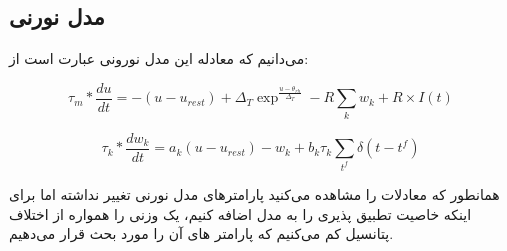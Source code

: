 \documentclass[12pt]{extreport}
\theoremstyle{definition}
\begin{document}
\subsection*{مدل نورنی }

می‌دانیم که معادله این مدل نورونی عبارت است از:

$$ \tau_m*\frac{du}{dt} = -(u - u_{rest}) + \Delta_{T} \exp^{\frac{u-\theta_{rh}}{\Delta_{T}}} - R \sum_k w_k + R \times I(t) $$

$$ \tau_k*\frac{dw_k}{dt} = a_k (u - u_{rest}) - w_k + b_k \tau_k \sum_{t^f} \delta(t-t^f)$$

همانطور که معادلات را مشاهده می‌کنید پارامترهای مدل نورنی تغییر نداشته اما برای اینکه خاصیت تطبیق پذیری را به مدل اضافه کنیم، یک وزنی را همواره از اختلاف پتانسیل کم می‌کنیم که پارامتر های آن را مورد بحث قرار می‌دهیم.
\end{document}
